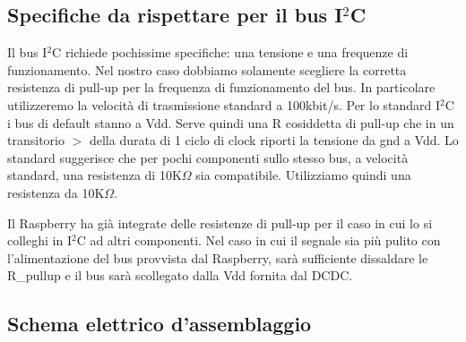 \documentclass[10pt]{article}
\begin{document}
	\subsection{Specifiche da rispettare per il bus I\(^2\)C}

		Il bus I\(^2\)C richiede pochissime specifiche: una tensione e una frequenze di funzionamento.
		Nel nostro caso dobbiamo solamente scegliere la corretta resistenza di pull-up per la frequenza di funzionamento del bus.
		In particolare utilizzeremo la velocità di trasmissione standard a 100kbit/s.
		Per lo standard I\(^2\)C i bus di default stanno a Vdd. Serve quindi una R cosiddetta di pull-up che in un transitorio \(>\) della durata di 1 ciclo di clock riporti la tensione da gnd a Vdd.
		Lo standard suggerisce che per pochi componenti sullo stesso bus, a velocità standard, una resistenza di 10K\(\Omega\) sia compatibile.
		Utilizziamo quindi una resistenza da 10K\(\Omega\).

		Il Raspberry ha già integrate delle resistenze di pull-up per il caso in cui lo si colleghi in I\(^2\)C ad altri componenti.
		Nel caso in cui il segnale sia più pulito con l'alimentazione del bus provvista dal Raspberry, sarà sufficiente dissaldare le R\_pullup e il bus sarà scollegato dalla Vdd fornita dal DCDC.


	\subsection{Schema elettrico d'assemblaggio}
\end{document}
